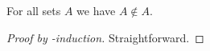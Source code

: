 \begin{proposition}\label{in_irrefl}
    For all sets $A$ we have $A\not\in A$.
\end{proposition}
\begin{proof}[Proof by \in-induction]
    Straightforward.
\end{proof}
